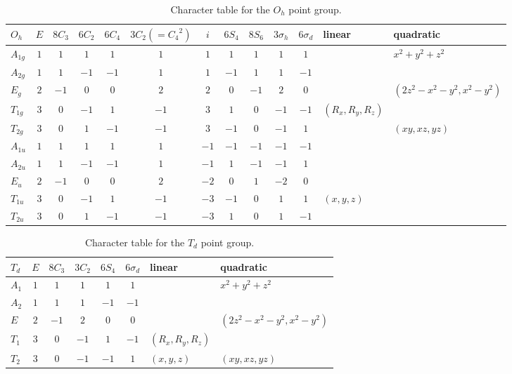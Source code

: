 \documentclass[../notes.tex]{subfiles}
\begin{document}
\begin{itemize}
    \begin{table}[h!]
        \centering
        \small
        \renewcommand{\arraystretch}{1.2}
        \begin{tabular}{l|cccccccccc|l|l}
            $O_h$ & $E$ & $8C_3$ & $6C_2$ & $6C_4$ & $3C_2(={C_4}^2)$ & $i$ & $6S_4$ & $8S_6$ & $3\sigma_h$ & $6\sigma_d$ & linear & quadratic\\
            \hline
            $A_{1g}$ & $1$ & $1$  & $1$  & $1$  & $1$  & $1$  & $1$  & $1$  & $1$  & $1$  & & $x^2+y^2+z^2$\\
            $A_{2g}$ & $1$ & $1$  & $-1$ & $-1$ & $1$  & $1$  & $-1$ & $1$  & $1$  & $-1$ & & \\
            $E_g$    & $2$ & $-1$ & $0$  & $0$  & $2$  & $2$  & $0$  & $-1$ & $2$  & $0$  & & $(2z^2-x^2-y^2,x^2-y^2)$\\
            $T_{1g}$ & $3$ & $0$  & $-1$ & $1$  & $-1$ & $3$  & $1$  & $0$  & $-1$ & $-1$ & $(R_x,R_y,R_z)$ & \\
            $T_{2g}$ & $3$ & $0$  & $1$  & $-1$ & $-1$ & $3$  & $-1$ & $0$  & $-1$ & $1$  & & $(xy,xz,yz)$\\
            $A_{1u}$ & $1$ & $1$  & $1$  & $1$  & $1$  & $-1$ & $-1$ & $-1$ & $-1$ & $-1$ & & \\
            $A_{2u}$ & $1$ & $1$  & $-1$ & $-1$ & $1$  & $-1$ & $1$  & $-1$ & $-1$ & $1$  & & \\
            $E_u$    & $2$ & $-1$ & $0$  & $0$  & $2$  & $-2$ & $0$  & $1$  & $-2$ & $0$  & & \\
            $T_{1u}$ & $3$ & $0$  & $-1$ & $1$  & $-1$ & $-3$ & $-1$ & $0$  & $1$  & $1$  & $(x,y,z)$ & \\
            $T_{2u}$ & $3$ & $0$  & $1$  & $-1$ & $-1$ & $-3$ & $1$  & $0$  & $1$  & $-1$ & & \\
        \end{tabular}
        \caption{Character table for the $O_h$ point group.}
        \label{fig:characterTable-Oh}
    \end{table}
    \begin{table}[h!]
        \centering
        \small
        \renewcommand{\arraystretch}{1.2}
        \begin{tabular}{l|ccccc|l|l}
            $T_d$ & $E$ & $8C_3$ & $3C_2$ & $6S_4$ & $6\sigma_d$ & linear & quadratic\\
            \hline
            $A_1$ & $1$ & $1$  & $1$  & $1$  & $1$  & & $x^2+y^2+z^2$\\
            $A_2$ & $1$ & $1$  & $1$  & $-1$ & $-1$ & & \\
            $E$   & $2$ & $-1$ & $2$  & $0$  & $0$  & & $(2z^2-x^2-y^2,x^2-y^2)$\\
            $T_1$ & $3$ & $0$  & $-1$ & $1$  & $-1$ & $(R_x,R_y,R_z)$ & \\
            $T_2$ & $3$ & $0$  & $-1$ & $-1$ & $1$  & $(x,y,z)$ & $(xy,xz,yz)$\\
        \end{tabular}
        \caption{Character table for the $T_d$ point group.}
        \label{fig:characterTable-Td}
    \end{table}
\end{itemize}
\end{document}
